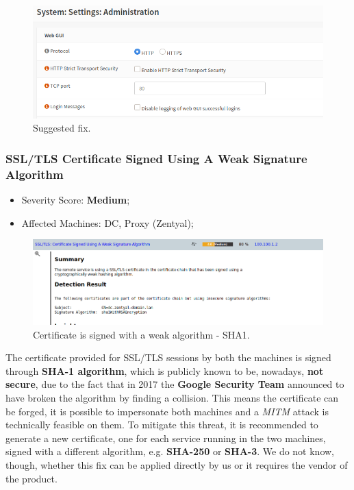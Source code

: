 \begin{figure}[!htb]
\centering
\begin{minipage}{.5\textwidth}
  \centering
  \includegraphics[width=1\textwidth]{vulnerabilityToMitigate.png}
  \caption[a]{Suggested fix.}\label{fig:11}
\end{minipage}%
\end{figure}

\subsubsection{SSL/TLS Certificate Signed Using A Weak Signature Algorithm}
\begin{itemize}
\item Severity Score: \textbf{Medium};
\item Affected Machines: DC, Proxy (Zentyal);
\end{itemize}
\begin{figure}[!htb]
\centering
\begin{minipage}{.5\textwidth}
  \centering
  \includegraphics[width=1\textwidth]{weakSHA1CertificateDCVuln.png}
  \caption[a]{Certificate is signed with a weak algorithm - SHA1.}\label{fig:14}
\end{minipage}%
\end{figure}

The certificate provided for SSL/TLS sessions by both the machines is signed through \textbf{SHA-1 algorithm}, which is publicly known to be, nowadays, \textbf{not secure}, due to the fact that in 2017 the \textbf{Google Security Team} announced to have broken the algorithm by finding a collision. This means the certificate can be forged, it is possible to impersonate both machines and a \textit{MITM} attack is technically feasible on them. To mitigate this threat, it is recommended to generate a new certificate, one for each service running in the two machines, signed with a different algorithm, e.g. \textbf{SHA-250} or \textbf{SHA-3}. We do not know, though, whether this fix can be applied directly by us or it requires the vendor of the product.

